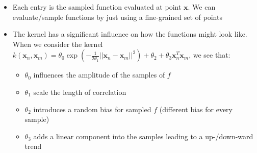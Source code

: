 \begin{itemize}
$$\begin{bmatrix}
	k(\bm{x}_1, \bm{x}_1) & \cdots & k(\bm{x}_1, \bm{x}_N)\\
	\vdots & \ddots & \vdots\\
	k(\bm{x}_N, \bm{x}_1)& \cdots & k(\bm{x}_N, \bm{x}_N)\\
	\end{bmatrix}\right)$$
	\item Each entry is the sampled function evaluated at point $\bm{x}$. We can evaluate/sample functions by just using a fine-grained set of points
	\item The kernel has a significant influence on how the functions might look like. When we consider the kernel $k(\bm{x}_n, \bm{x}_m) = \theta_0 \exp\left(-\frac{1}{2\theta_1}||\bm{x}_n - \bm{x}_m||^2\right) + \theta_2 + \theta_3 \bm{x}_n^T \bm{x}_m$, we see that:
	\begin{itemize}
		\item $\theta_0$ influences the amplitude of the samples of $f$
		\item $\theta_1$ scale the length of correlation
		\item $\theta_2$ introduces a random bias for sampled $f$ (different bias for every sample)
		\item $\theta_3$ adds a linear component into the samples leading to a up-/down-ward trend
	\end{itemize}
\end{itemize}
